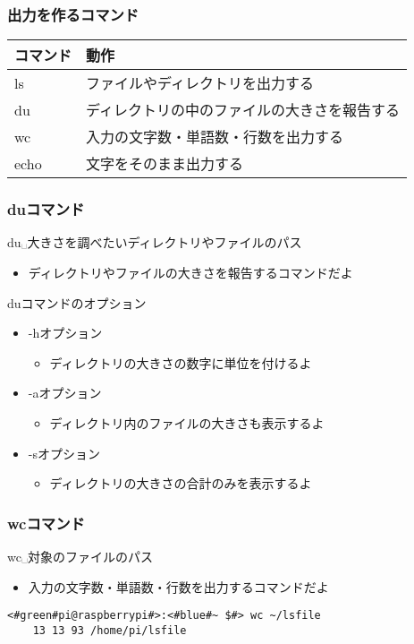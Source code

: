 \begin{frame}
    \frametitle{出力を作るコマンド}
    \begin{tabular}{ll}
        コマンド & 動作                                         \\ \hline
        ls       & ファイルやディレクトリを出力する             \\
        du       & ディレクトリの中のファイルの大きさを報告する \\
        wc       & 入力の文字数・単語数・行数を出力する         \\
        echo     & 文字をそのまま出力する                       \\ \hline
    \end{tabular}
\end{frame}

\begin{frame}
    \frametitle{duコマンド}
    du␣大きさを調べたいディレクトリやファイルのパス
    \begin{itemize}
        \item ディレクトリやファイルの大きさを報告するコマンドだよ
    \end{itemize}
    duコマンドのオプション
    \begin{itemize}
        \item  -hオプション
        \begin{itemize}
            \item ディレクトリの大きさの数字に単位を付けるよ
        \end{itemize}
        \item -aオプション
        \begin{itemize}
            \item ディレクトリ内のファイルの大きさも表示するよ
        \end{itemize}
        \item -sオプション
        \begin{itemize}
            \item ディレクトリの大きさの合計のみを表示するよ
        \end{itemize}
    \end{itemize}
\end{frame}

\begin{frame}[fragile]
    \frametitle{wcコマンド}
    wc␣対象のファイルのパス
    \begin{itemize}
        \item 入力の文字数・単語数・行数を出力するコマンドだよ
    \end{itemize}
    \begin{lstlisting}[title=wcコマンドの実行例, label=wc_example]
    <#green#pi@raspberrypi#>:<#blue#~ $#> wc ~/lsfile
    13 13 93 /home/pi/lsfile
    \end{lstlisting}
\end{frame}

